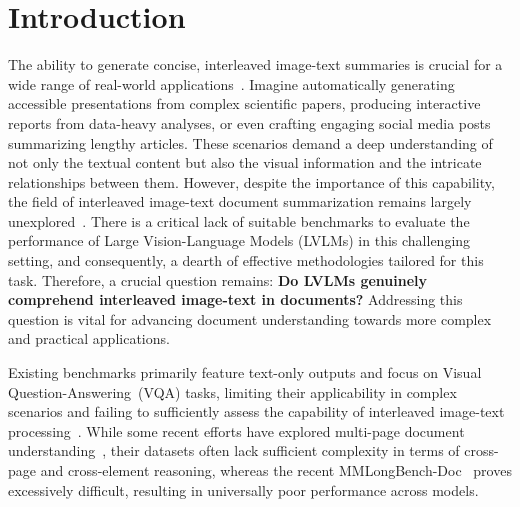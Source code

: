 \section{Introduction}
The ability to generate concise, interleaved image-text summaries is crucial for a wide range of real-world applications~\cite{visualwebbench_s29, docvqa_s13}. 
Imagine automatically generating accessible presentations from complex scientific papers, producing interactive reports from data-heavy analyses, or even crafting engaging social media posts summarizing lengthy articles. 
These scenarios demand a deep understanding of not only the textual content but also the visual information and the intricate relationships between them. 
However, despite the importance of this capability, the field of interleaved image-text document summarization remains largely unexplored~\cite{chartqa_s15, towards_s28, infographicvqa_s17}. 
There is a critical lack of suitable benchmarks to evaluate the performance of Large Vision-Language Models (LVLMs) in this challenging setting, and consequently, a dearth of effective methodologies tailored for this task.
Therefore, a crucial question remains: \textbf{Do LVLMs genuinely comprehend interleaved image-text in documents? }
Addressing this question is vital for advancing document understanding towards more complex and practical applications.

Existing benchmarks primarily feature text-only outputs and focus on Visual Question-Answering~(VQA) tasks, limiting their applicability in complex scenarios and failing to sufficiently assess the capability of interleaved image-text processing~\cite{longbench_s3, blau2024gram_ss15, kim2022ocr_ss4, lee2023pix2struct_ss5}.
While some recent efforts have explored multi-page document understanding~\cite{hierarchical_s35, document_s31, slidevqa_s32}, their datasets often lack sufficient complexity in terms of cross-page and cross-element reasoning, whereas the recent MMLongBench-Doc~\cite{mmlongbench_s36} proves excessively difficult, resulting in universally poor performance across models.

